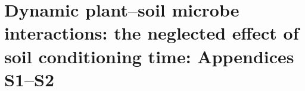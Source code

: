\chapter{Dynamic plant--soil microbe interactions: the neglected effect of soil conditioning time: Appendices S1--S2}
\fancyhead[LE, RO]{\thepage}
\fancyfoot{}
\renewcommand{\headrulewidth}{0pt}
\setlength{\parindent}{1cm}

